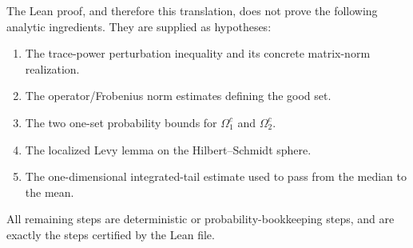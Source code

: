 \documentclass[11pt]{article}
\begin{document}
The Lean proof, and therefore this translation, does not prove the following
analytic ingredients.  They are supplied as hypotheses:
\begin{enumerate}[label=\arabic*.]
  \item The trace-power perturbation inequality and its concrete matrix-norm
  realization.
  \item The operator/Frobenius norm estimates defining the good set.
  \item The two one-set probability bounds for \(\Omega_1^c\) and
  \(\Omega_2^c\).
  \item The localized Levy lemma on the Hilbert--Schmidt sphere.
  \item The one-dimensional integrated-tail estimate used to pass from the
  median to the mean.
\end{enumerate}

All remaining steps are deterministic or probability-bookkeeping steps, and
are exactly the steps certified by the Lean file.
\end{document}
